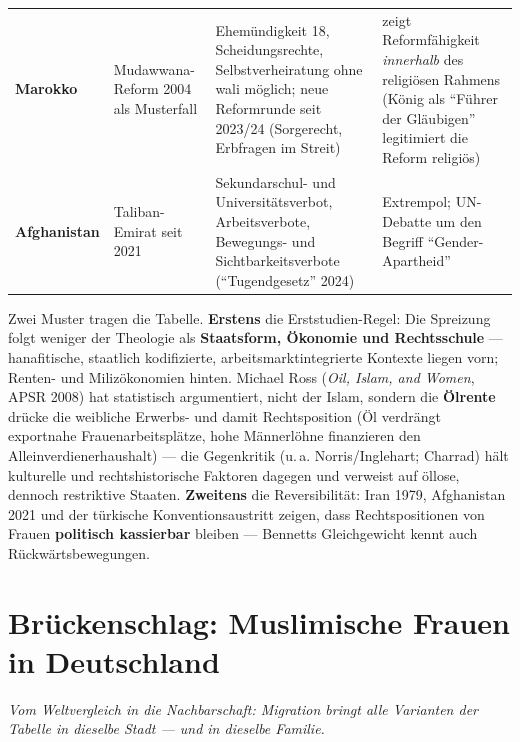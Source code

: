 \documentclass[11pt,a4paper,ngerman]{scrartcl}
\newcommand{\chipbase}[2]{\hspace{0pt}{\footnotesize\textcolor{#1}{[\textsc{#2}]}}}
\newcommand{\chipbelegt}[1]{\chipbase{chipgreen}{#1}}
\newcommand{\chipumstritten}[1]{\chipbase{chipred}{#1}}
\begin{document}
\begin{small}
\begin{longtable}{>{\raggedright\arraybackslash}p{}>{\raggedright\arraybackslash}p{}>{\raggedright\arraybackslash}p{}>{\raggedright\arraybackslash}p{}}
\addlinespace[2pt]
\textbf{Marokko} & Mudawwana-Reform 2004 als Musterfall & Ehemündigkeit 18, Scheidungsrechte, Selbstverheiratung ohne wali möglich; neue Reformrunde seit 2023/24 (Sorgerecht, Erbfragen im Streit) & zeigt Reformfähigkeit \emph{innerhalb} des religiösen Rahmens (König als \enquote{Führer der Gläubigen} legitimiert die Reform religiös) \\
\addlinespace[2pt]
\textbf{Afghanistan} & Taliban-Emirat seit 2021 & Sekundarschul- und Universitätsverbot, Arbeitsverbote, Bewegungs- und Sichtbarkeitsverbote (\enquote{Tugendgesetz} 2024) & Extrempol; UN-Debatte um den Begriff \enquote{Gender-Apartheid} \\
\bottomrule
\end{longtable}
\end{small}

Zwei Muster tragen die Tabelle. \textbf{Erstens} die Erststudien-Regel: Die Spreizung folgt weniger der Theologie als \textbf{Staatsform, Ökonomie und Rechtsschule} --- hanafitische, staatlich kodifizierte, arbeitsmarktintegrierte Kontexte liegen vorn; Renten- und Milizökonomien hinten. Michael Ross (\emph{Oil, Islam, and Women}, APSR 2008) hat statistisch argumentiert, nicht der Islam, sondern die \textbf{Ölrente} drücke die weibliche Erwerbs- und damit Rechtsposition (Öl verdrängt exportnahe Frauenarbeitsplätze, hohe Männerlöhne finanzieren den Alleinverdienerhaushalt) --- die Gegenkritik (u.\,a. Norris/Inglehart; Charrad) hält kulturelle und rechtshistorische Faktoren dagegen und verweist auf öllose, dennoch restriktive Staaten. \chipumstritten{umstritten} \textbf{Zweitens} die Reversibilität: Iran 1979, Afghanistan 2021 und der türkische Konventionsaustritt zeigen, dass Rechtspositionen von Frauen \textbf{politisch kassierbar} bleiben --- Bennetts Gleichgewicht kennt auch Rückwärtsbewegungen. \chipbelegt{belegt}

\section{Brückenschlag: Muslimische Frauen in Deutschland}
\noindent\textit{Vom Weltvergleich in die Nachbarschaft: Migration bringt alle Varianten der Tabelle in dieselbe Stadt --- und in dieselbe Familie.}
\medskip
\end{document}
